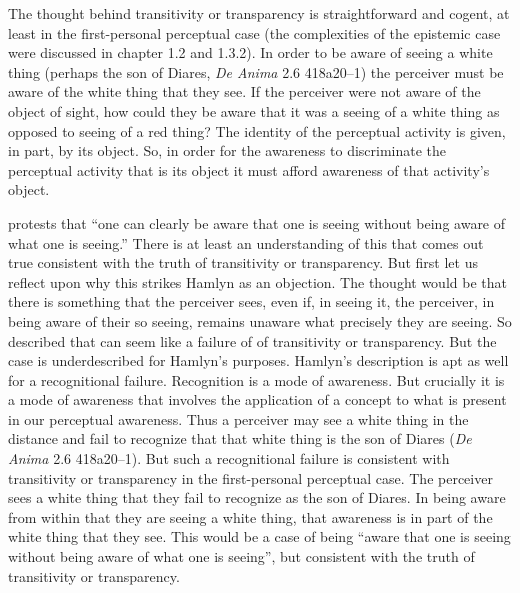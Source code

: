 
The thought behind transitivity or transparency is straightforward and cogent, at least in the first-personal perceptual case (the complexities of the epistemic case were discussed in chapter 1.2 and 1.3.2). In order to be aware of seeing a white thing (perhaps the son of Diares, \emph{De Anima} 2.6 418a20–1) the perceiver must be aware of the white thing that they see. If the perceiver were not aware of the object of sight, how could they be aware that it was a seeing of a white thing as opposed to seeing of a red thing? The identity of the perceptual activity is given, in part, by its object. So, in order for the awareness to discriminate the perceptual activity that is its object it must afford awareness of that activity's object.

\citet[122]{Hamlyn:1961ys} protests that ``one can clearly be aware that one is seeing without being aware of what one is seeing.'' There is at least an understanding of this that comes out true consistent with the truth of transitivity or transparency. But first let us reflect upon why this strikes Hamlyn as an objection. The thought would be that there is something that the perceiver sees, even if, in seeing it, the perceiver, in being aware of their so seeing, remains unaware what precisely they are seeing. So described that can seem like a failure of of transitivity or transparency. But the case is underdescribed for Hamlyn's purposes. Hamlyn's description is apt as well for a recognitional failure. Recognition is a mode of awareness. But crucially it is a mode of awareness that involves the application of a concept to what is present in our perceptual awareness. Thus a perceiver may see a white thing in the distance and fail to recognize that that white thing is the son of Diares (\emph{De Anima} 2.6 418a20–1). But such a recognitional failure is consistent with transitivity or transparency in the first-personal perceptual case. The perceiver sees a white thing that they fail to recognize as the son of Diares. In being aware from within that they are seeing a white thing, that awareness is in part of the white thing that they see. This would be a case of being ``aware that one is seeing without being aware of what one is seeing'', but consistent with the truth of transitivity or transparency.

